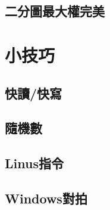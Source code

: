 \documentclass[a4paper,10pt,twocolumn,oneside]{article}
\begin{document}
\subsection{二分圖最大權完美}



% 
% 


\section{小技巧}
\subsection{快讀/快寫}

% 
\subsection{隨機數}

\subsection{Linus指令}

\subsection{Windows對拍}



% 
% 
\end{document}
